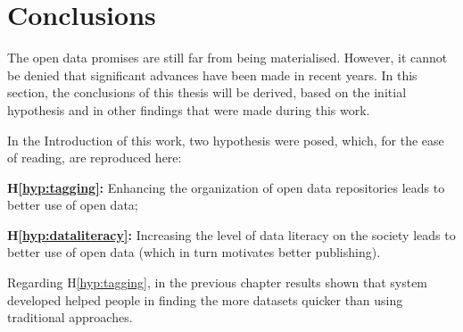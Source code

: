 \chapter{Conclusions}
\label{chap:conclusions}

The open data promises are still far from being materialised.
However, it cannot be denied that significant advances have been made in recent years.
In this section, the conclusions of this thesis will be derived, based on the initial hypothesis and in other findings that were made during this work.

In the Introduction of this work, two hypothesis were posed, which, for the ease of reading, are reproduced here:

\noindent\textbf{H\ref{hyp:tagging}:} Enhancing the organization of open data repositories leads to better use of open data;

\noindent\textbf{H\ref{hyp:dataliteracy}:} Increasing the level of data literacy on the society leads to better use of open data (which in turn motivates better publishing).

Regarding H\ref{hyp:tagging}, in the previous chapter results shown that system developed helped people in finding the more datasets quicker than using traditional approaches.


